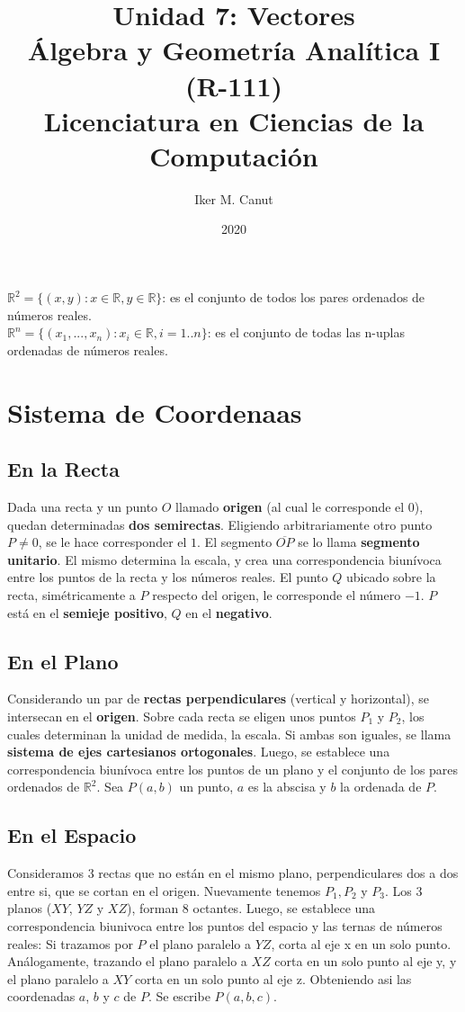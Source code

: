 \documentclass[11pt,a4paper]{article}
\author{Iker M. Canut}
\title{Unidad 7: Vectores\\\'Algebra y Geometr\'ia Anal\'itica I (R-111)\\Licenciatura en Ciencias de la Computaci\'on}
\date{2020}
\begin{document}
\maketitle
\newpage

\noindent $\mathbb{R}^2 = \{(x,y) : x\in\mathbb{R}, y\in\mathbb{R}\}$: es el conjunto de todos los pares ordenados de n\'umeros reales.\\
\noindent $\mathbb{R}^n = \{(x_1,...,x_n) : x_i\in\mathbb{R}, i=1..n\}$: es el conjunto de todas las n-uplas ordenadas de n\'umeros reales.

\section{Sistema de Coordenaas}
\subsection{En la Recta}
\noindent Dada una recta y un punto $O$ llamado \textbf{origen} (al cual le corresponde el 0), quedan determinadas \textbf{dos semirectas}. Eligiendo arbitrariamente otro punto $P\not=0$, se le hace corresponder el $1$. El segmento $\overline{OP}$ se lo llama \textbf{segmento unitario}. El mismo determina la escala, y crea una correspondencia biun\'ivoca entre los puntos de la recta y los n\'umeros reales. El punto $Q$ ubicado sobre la recta, sim\'etricamente a $P$ respecto del origen, le corresponde el n\'umero $-1$. $P$ est\'a en el \textbf{semieje positivo}, $Q$ en el \textbf{negativo}.
\subsection{En el Plano}
\noindent Considerando un par de \textbf{rectas perpendiculares} (vertical y horizontal), se intersecan en el \textbf{origen}. Sobre cada recta se eligen unos puntos $P_1$ y $P_2$, los cuales determinan la unidad de medida, la escala. Si ambas son iguales, se llama \textbf{sistema de ejes cartesianos ortogonales}. Luego, se establece una correspondencia biunívoca entre los puntos de un plano y el conjunto de los pares ordenados de $\mathbb{R}^2$. Sea $P(a,b)$ un punto, $a$ es la abscisa y $b$ la ordenada de $P$.
\subsection{En el Espacio}
\noindent Consideramos 3 rectas que no est\'an en el mismo plano, perpendiculares dos a dos entre si, que se cortan en el origen. Nuevamente tenemos $P_1, P_2$ y $P_3$. Los 3 planos ($XY$, $YZ$ y $XZ$), forman 8 octantes. Luego, se establece una correspondencia biunivoca entre los puntos del espacio y las ternas de n\'umeros reales: Si trazamos por $P$ el plano paralelo a $YZ$, corta al eje x en un solo punto. An\'alogamente, trazando el plano paralelo a $XZ$ corta en un solo punto al eje y, y el plano paralelo a $XY$ corta en un solo punto al eje z. Obteniendo asi las coordenadas $a$, $b$ y $c$ de $P$. Se escribe $P(a,b,c)$.
\end{document}
